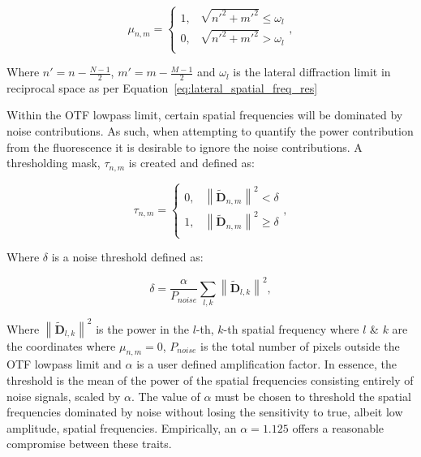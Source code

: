 \begin{equation}\label{eq:circular_mask}
\mu_{n,m} = 
\begin{cases}
1, & \sqrt{n'^{2} + m'^{2}} \le \omega_{l}\\
0, & \sqrt{n'^{2} + m'^{2}} > \omega_{l}\\ 
\end{cases},
\end{equation}

Where $n' = n - \frac{N-1}{2}$, $m' = m - \frac{M-1}{2}$ and $\omega_{l}$ 
is the lateral diffraction limit in reciprocal space as per
Equation~\ref{eq:lateral_spatial_freq_res} 

Within the OTF lowpass limit, certain spatial frequencies will be dominated
by noise contributions. As such, when attempting to quantify the power 
contribution from the fluorescence it is desirable to ignore the noise
contributions. A thresholding mask, $\tau_{n,m}$ is created and defined as:

\begin{equation}\label{eq:noise_threshold_mask}
\tau_{n,m} = 
\begin{cases}
0, & \left\| \tilde{\textbf{D}}_{n,m} \right\|^2 < \delta\\
1, & \left\| \tilde{\textbf{D}}_{n,m} \right\|^2 \ge \delta\\ 
\end{cases},
\end{equation}

Where $\delta$ is a noise threshold defined as:

\begin{equation}\label{eq:noise_threshold}
\delta = \frac{\alpha}{P_{noise}}\sum\limits_{l,k}{\left\| \tilde{\textbf{D}}_{l,k} \right\|^2},
\end{equation}

Where $\left\| \tilde{\textbf{D}}_{l,k} \right\|^2$ is the power in the 
$l$-th, $k$-th spatial frequency where $l$ \& $k$ are the coordinates 
where $\mu_{n,m} = 0$, $P_{noise}$ is the total number of pixels 
outside the OTF lowpass limit and $\alpha$ is a user defined 
amplification factor. In essence, the threshold is the mean of the
power of the spatial frequencies consisting entirely of noise signals,
scaled by $\alpha$.	The value of $\alpha$ must be chosen to threshold
the spatial frequencies dominated by noise without losing the sensitivity
to true, albeit low amplitude, spatial frequencies. Empirically, an 
$\alpha = 1.125$ offers a reasonable compromise between these traits.

